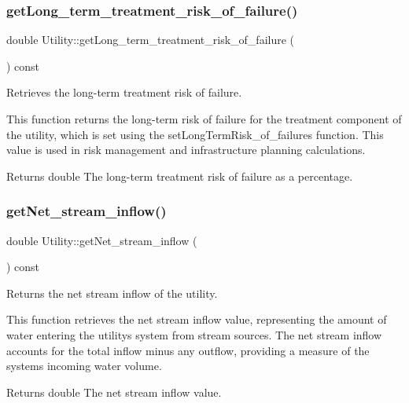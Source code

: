 \subsubsection{\texorpdfstring{get\+Long\+\_\+term\+\_\+treatment\+\_\+risk\+\_\+of\+\_\+failure()}{getLong\_term\_treatment\_risk\_of\_failure()}}
{\footnotesize\ttfamily double Utility\+::get\+Long\+\_\+term\+\_\+treatment\+\_\+risk\+\_\+of\+\_\+failure (\begin{DoxyParamCaption}{ }\end{DoxyParamCaption}) const}



Retrieves the long-\/term treatment risk of failure. 

This function returns the long-\/term risk of failure for the treatment component of the utility, which is set using the set\+Long\+Term\+Risk\+\_\+of\+\_\+failures function. This value is used in risk management and infrastructure planning calculations.

\begin{DoxyReturn}{Returns}
double The long-\/term treatment risk of failure as a percentage. 
\end{DoxyReturn}
\mbox{\label{classUtility_a93d865d309801d2b44687b2e14620386}} 
\subsubsection{\texorpdfstring{get\+Net\+\_\+stream\+\_\+inflow()}{getNet\_stream\_inflow()}}
{\footnotesize\ttfamily double Utility\+::get\+Net\+\_\+stream\+\_\+inflow (\begin{DoxyParamCaption}{ }\end{DoxyParamCaption}) const}



Returns the net stream inflow of the utility. 

This function retrieves the net stream inflow value, representing the amount of water entering the utility\textquotesingle{}s system from stream sources. The net stream inflow accounts for the total inflow minus any outflow, providing a measure of the system\textquotesingle{}s incoming water volume.

\begin{DoxyReturn}{Returns}
double The net stream inflow value. 
\end{DoxyReturn}
\mbox{\label{classUtility_ade3427a88355631a3657f752ace874fc}} 

